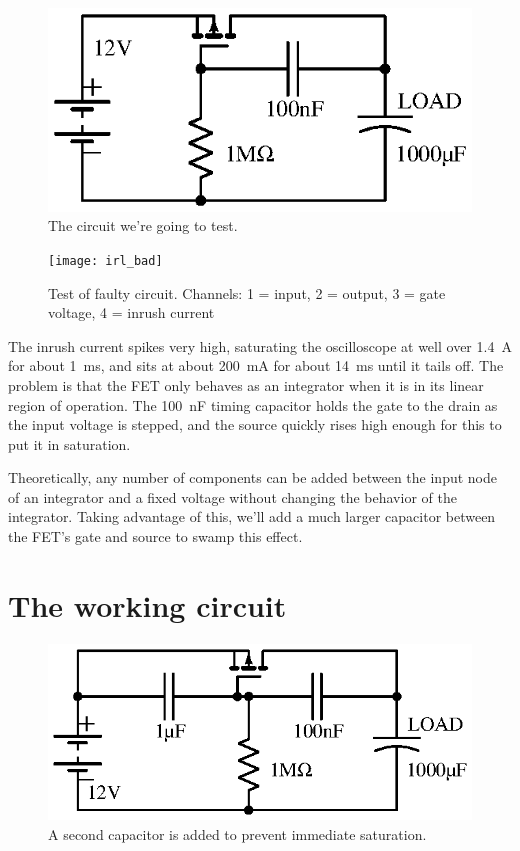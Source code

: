 \documentclass[letterpaper,12pt]{article}
\begin{document}
\begin{figure}[H]
\centering
\includegraphics{what_not_to_do_3}
\caption{The circuit we're going to test.}
\end{figure}

\begin{figure}[H]
\centering
\texttt{[image: irl\_bad]}
\caption{Test of faulty circuit. Channels: 1 = input, 2 = output, 3 = gate voltage, 4 = inrush current}
\end{figure}

The inrush current spikes very high, saturating the oscilloscope at well over
\SI{1.4}{A} for about \SI{1}{ms}, and sits at about \SI{200}{mA} for about
\SI{14}{ms} until it tails off.
The problem is that the FET only behaves as an integrator when it is in its
linear region of operation.  The \SI{100}{nF} timing capacitor holds the gate
to the drain as the input voltage is stepped, and the source quickly rises high
enough for this to put it in saturation.

Theoretically, any number of components can be added between the input node of
an integrator and a fixed voltage without changing the behavior of the integrator.
Taking advantage of this, we'll add a much larger capacitor between the FET's gate
and source to swamp this effect.

\section{The working circuit}
\label{sec:good}

\begin{figure}[H]
\centering
\includegraphics{do_this}
\caption{A second capacitor is added to prevent immediate saturation.}
\end{figure}
\end{document}
